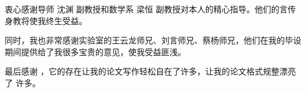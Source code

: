 \begin{acknowledgement}
  衷心感谢导师 沈渊 副教授和数学系 梁恒 副教授对本人的精心指导。他们的言传身教将使我终生受益。

  同时，我也非常感谢实验室的王云龙师兄、刘言师兄、蔡杨师兄，他们在我的毕设期间提供给了我很多宝贵的意见，使我受益匪浅。
  
  最后感谢 \thuthesis，它的存在让我的论文写作轻松自在了许多，让我的论文格式规整漂亮了
  许多。
\end{acknowledgement}
